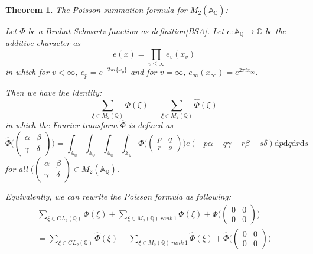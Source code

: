 \documentclass[12pt,a4paper,english]{article}
\theoremstyle{plain}
\newtheorem{thm}{Theorem}[section]
\theoremstyle{definition}
\begin{document}
\begin{thm}\label{poissonA}
The Poisson summation formula for $M_{2}(\mathbb{A}_{\mathbb{Q}})$:

Let $\Phi$ be a Bruhat-Schwartz function as definition\ref{BSA}. Let $e:\mathbb{A}_{\mathbb{Q}}\rightarrow\mathbb{C}$ be the additive character as 
\begin{equation*}
    e(x)=\prod_{v\leq \infty}e_{v}(x_{v})
\end{equation*}
in which for $v<\infty$, $e_{p}=e^{-2\pi i\{x_{p}\}}$ and for $v=\infty$, $e_{\infty}(x_{\infty})=e^{2\pi ix_{\infty}}$.

Then we have the identity:
\begin{equation*}
    \sum_{\xi\in M_{2}(\mathbb{Q})}\Phi(\xi)=\sum_{\xi\in M_{2}(\mathbb{Q})}\hat{\Phi}(\xi)
\end{equation*}
in which the Fourier transform $\hat{\Phi}$ is defined as 
\begin{equation*}
    \hat{\Phi}\big(\begin{pmatrix}
    \alpha &\beta\\
    \gamma & \delta
    \end{pmatrix}\big)=\int_{\mathbb{A}_{\mathbb{Q}}}\int_{\mathbb{A}_{\mathbb{Q}}}\int_{\mathbb{A}_{\mathbb{Q}}}\int_{\mathbb{A}_{\mathbb{Q}}}\Phi\big(\begin{pmatrix}
    p &q\\
    r & s
    \end{pmatrix}\big)e(-p\alpha-q\gamma-r\beta-s\delta)\text{d}p\text{d}q\text{d}r\text{d}s
\end{equation*}
for all $\big(\begin{pmatrix}
    \alpha &\beta\\
    \gamma & \delta
    \end{pmatrix}\in M_{2}(\mathbb{A}_{\mathbb{Q}})$.
    
Equivalently, we can rewrite the Poisson formula as following:
\begin{align*}
    \sum_{\xi\in GL_{2}(\mathbb{Q})}\Phi(\xi)+\sum_{\xi\in M_{2}(\mathbb{Q})\ rank\ 1}\Phi(\xi) +\Phi\big(\begin{pmatrix}
    0&0\\
    0&0
    \end{pmatrix}\big)\\
    =\sum_{\xi\in GL_{2}(\mathbb{Q})}\hat{\Phi}(\xi)+\sum_{\xi\in M_{2}(\mathbb{Q})\ rank\ 1} \hat{\Phi}(\xi)+\hat{\Phi}\big(\begin{pmatrix}
    0&0\\
    0&0
    \end{pmatrix}\big)
\end{align*}
\end{thm}
\end{document}
